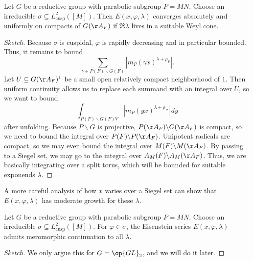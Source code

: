 \documentclass{article}
\begin{document}
\begin{proposition}
	Let $G$ be a reductive group with parabolic subgroup $P=MN$. Choose an irreducible $\sigma\subseteq L^2_{\mathrm{cusp}}([M])$. Then $E(x,\varphi,\lambda)$ converges absolutely and uniformly on compacts of $G(\AA_F)$ if $\Re\lambda$ lives in a suitable Weyl cone.
\end{proposition}
\begin{proof}[Sketch]
	Because $\sigma$ is cuspidal, $\varphi$ is rapidly decreasing and in particular bounded. Thus, it remains to bound
	\[\sum_{\gamma\in P(F)\backslash G(F)}\left|m_P(\gamma x)^{\lambda+\rho_P}\right|.\]
	Let $U\subseteq G(\AA_F)^1$ be a small open relatively compact neighborhood of $1$. Then uniform continuity allows us to replace each summand with an integral over $U$, so we want to bound
	\[\int_{P(F)\backslash G(F)V}\left|m_P(yx)^{\lambda+\rho_P}\right|\,dy\]
	after unfolding. Because $P\backslash G$ is projective, $P(\AA_F)\backslash G(\AA_F)$ is compact, so we need to bound the integral over $P(F)\backslash P(\AA_F)$. Unipotent radicals are compact, so we may even bound the integral over $M(F)\backslash M(\AA_F)$. By passing to a Siegel set, we may go to the integral over $A_M(F)\backslash A_M(\AA_F)$. Thus, we are basically integrating over a split torus, which will be bounded for suitable exponends $\lambda$.
\end{proof}
\begin{remark}
	A more careful analysis of how $x$ varies over a Siegel set can show that $E(x,\varphi,\lambda)$ has moderate growth for these $\lambda$.
\end{remark}
\begin{theorem}
	Let $G$ be a reductive group with parabolic subgroup $P=MN$. Choose an irreducible $\sigma\subseteq L^2_{\mathrm{cusp}}([M])$. For $\varphi\in\sigma$, the Eisenstein series $E(x,\varphi,\lambda)$ admits meromorphic continuation to all $\lambda$.
\end{theorem}
\begin{proof}[Sketch]
	We only argue this for $G=\op{GL}_2$, and we will do it later.
\end{proof}
\end{document}
